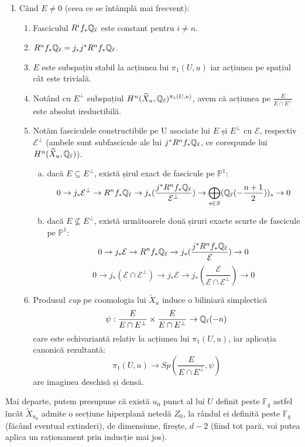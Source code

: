 \documentclass[13pt,openany,oneside]{book}
\begin{document}
\begin{teo}
\begin{enumerate}[I.]
\item Când $E\neq 0$ (ceea ce se întâmplă mai frecvent):
\begin{enumerate}[1.]
\item Fasciculul $R^i f_* \mathbb{Q}_\ell$ este constant pentru $i\neq n$.
\item $R^n f_* \mathbb{Q}_\ell = j_* j^* R^n f_* \mathbb{Q}_\ell$.
\item $E$ este subspațiu stabil la acțiunea lui $\pi_1(U,u)$ iar acțiunea pe spațiul cât este trivială.
\item Notând cu $E^\perp$ subspațiul $H^n(\widetilde{X}_u,\mathbb{Q}_\ell)^{\pi_1(U,u)}$, avem că acțiunea pe $\frac{E}{E \cap E^\perp}$ este absolut ireductibilă.
\item Notăm fasciculele constructibile pe U asociate lui $E$ și $E^\perp$ cu $\mathcal{E}$, respectiv $\mathcal{E}^\perp$ (ambele sunt subfascicule ale lui $j^* R^n f_* \mathbb{Q}_\ell$, ce corespunde lui $H^n(\widetilde{X}_u,\mathbb{Q}_\ell)$).
\begin{enumerate}[a)]
\item dacă $E \subseteq E^\perp$, există șirul exact de fascicule pe $\mathbb{P}^1$:
$$0 \rightarrow j_* \mathcal{E}^\perp \rightarrow R^n f_* \mathbb{Q}_\ell \rightarrow j_*(\frac{j^* R^n f_* \mathbb{Q}_\ell}{\mathcal{E}^\perp}) \rightarrow \bigoplus\limits_{s\in S} (\mathbb{Q}_\ell(-\frac{n+1}{2}))_s \rightarrow 0$$
\item dacă $E \nsubseteq E^\perp$, există următoarele două șiruri exacte scurte de fascicule pe $\mathbb{P}^1$:
$$0\rightarrow j_*\mathcal{E} \rightarrow R^n f_* \mathbb{Q}_\ell \rightarrow j_*(\frac{j^* R^n f_* \mathbb{Q}_\ell}{\mathcal{E}}) \rightarrow 0$$
$$0 \rightarrow j_*(\mathcal{E} \cap \mathcal{E}^\perp)  \rightarrow j_*\mathcal{E}  \rightarrow j_*(\frac{\mathcal{E}}{\mathcal{E} \cap \mathcal{E}^\perp})  \rightarrow 0$$
\end{enumerate}
\item Produsul {\it cup} pe coomologia lui $\widetilde{X}_u$ induce o biliniară simplectică
$$\psi : \frac{E}{E \cap E^\perp} \times \frac{E}{E \cap E^\perp} \rightarrow \mathbb{Q}_\ell(-n)$$
care este echivariantă relativ la acțiunea lui $\pi_1(U,u)$, iar aplicația canonică rezultantă:
$$\pi_1(U,u) \rightarrow Sp(\frac{E}{E \cap E^\perp},\psi)$$
are imaginea deschisă și densă.
\end{enumerate}
\end{enumerate}
\end{teo}

Mai departe, putem presupune că există $u_0$ punct al lui $U$ definit peste $\mathbb{F}_q$ astfel încât $\widetilde{X}_{u_0}$ admite o secțiune hiperplană netedă $Z_0$, la rândul ei definită peste $\mathbb{F}_q$ (făcând eventual extinderi), de dimensiune, firește, $d-2$ (fiind tot pară, voi putea aplica un raționament prin inducție mai jos).
\end{document}
